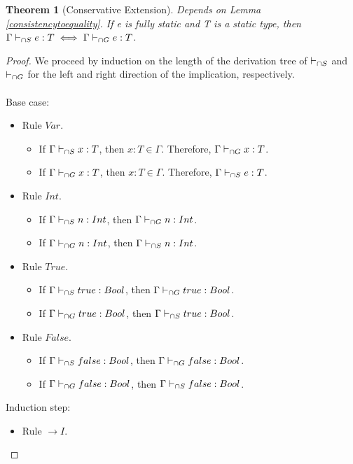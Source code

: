 \documentclass[a4paper]{article}
\newtheorem{theorem}{Theorem}
\begin{document}
\begin{theorem}[Conservative Extension]
\label{conservative_extension_typesystem}
Depends on Lemma \ref{consistencytoequality}.
If e is fully static and T is a static type, then $\Gamma \vdash_{\cap S} e : T \iff \Gamma \vdash_{\cap G} e : T$.
\end{theorem}
\begin{proof}
We proceed by induction on the length of the derivation tree of $\vdash_{\cap S}$ and $\vdash_{\cap G}$ for the left and right direction of the implication, respectively.\\\\
Base case:
\begin{itemize}
    \item Rule $Var$.
    \begin{itemize}
        \item If $\Gamma \vdash_{\cap S} x : T$, then $x : T \in \Gamma$.
        Therefore, $\Gamma \vdash_{\cap G} x : T$.
        \item If $\Gamma \vdash_{\cap G} x : T$, then $x : T \in \Gamma$.
        Therefore, $\Gamma \vdash_{\cap S} e : T$.
    \end{itemize}
    \item Rule $Int$.
    \begin{itemize}
        \item If $\Gamma \vdash_{\cap S} n : {Int}$, then $\Gamma \vdash_{\cap G} n : {Int}$.
        \item If $\Gamma \vdash_{\cap G} n : {Int}$, then $\Gamma \vdash_{\cap S} n : {Int}$.
    \end{itemize}
    \item Rule $True$.
    \begin{itemize}
        \item If $\Gamma \vdash_{\cap S} true : Bool$, then $\Gamma \vdash_{\cap G} true : Bool$.
        \item If $\Gamma \vdash_{\cap G} true : Bool$, then $\Gamma \vdash_{\cap S} true : Bool$.
    \end{itemize}
    \item Rule $False$.
    \begin{itemize}
        \item If $\Gamma \vdash_{\cap S} false : Bool$, then $\Gamma \vdash_{\cap G} false : Bool$.
        \item If $\Gamma \vdash_{\cap G} false : Bool$, then $\Gamma \vdash_{\cap S} false : Bool$.
    \end{itemize}
\end{itemize}
Induction step:
\begin{itemize}
    \item Rule ${\rightarrow} I$.

\end{itemize}
\end{proof}
\end{document}
